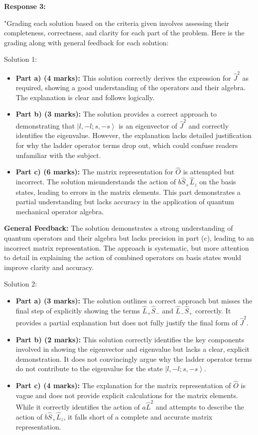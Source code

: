 \documentclass[a4paper,11pt]{article}
\begin{document}
\textbf{Response 3:}

"Grading each solution based on the criteria given involves assessing their completeness, correctness, and clarity for each part of the problem. Here is the grading along with general feedback for each solution:

Solution 1:

\begin{itemize}
    \item \textbf{Part a) (4 marks):} This solution correctly derives the expression for \( \hat{J}^2 \) as required, showing a good understanding of the operators and their algebra. The explanation is clear and follows logically.
    \item \textbf{Part b) (3 marks):} The solution provides a correct approach to demonstrating that \( \left|l, -l; s, -s \right> \) is an eigenvector of \( \hat{J}^2 \) and correctly identifies the eigenvalue. However, the explanation lacks detailed justification for why the ladder operator terms drop out, which could confuse readers unfamiliar with the subject.
    \item \textbf{Part c) (6 marks):} The matrix representation for \( \hat{O} \) is attempted but incorrect. The solution misunderstands the action of \( b\hat{S}_{+}\hat{L}_{z} \) on the basis states, leading to errors in the matrix elements. This part demonstrates a partial understanding but lacks accuracy in the application of quantum mechanical operator algebra.
\end{itemize}

\textbf{General Feedback:} The solution demonstrates a strong understanding of quantum operators and their algebra but lacks precision in part (c), leading to an incorrect matrix representation. The approach is systematic, but more attention to detail in explaining the action of combined operators on basis states would improve clarity and accuracy.

Solution 2:

\begin{itemize}
    \item \textbf{Part a) (3 marks):} The solution outlines a correct approach but misses the final step of explicitly showing the terms \( \hat{L}_{+}\hat{S}_{-} \) and \( \hat{L}_{-}\hat{S}_{+} \) correctly. It provides a partial explanation but does not fully justify the final form of \( \hat{J}^2 \).
    \item \textbf{Part b) (2 marks):} This solution correctly identifies the key components involved in showing the eigenvector and eigenvalue but lacks a clear, explicit demonstration. It does not convincingly argue why the ladder operator terms do not contribute to the eigenvalue for the state \( \left|l, -l; s, -s \right> \).
    \item \textbf{Part c) (4 marks):} The explanation for the matrix representation of \( \hat{O} \) is vague and does not provide explicit calculations for the matrix elements. While it correctly identifies the action of \( a\hat{L}^2 \) and attempts to describe the action of \( b\hat{S}_{+}\hat{L}_{z} \), it falls short of a complete and accurate matrix representation.
\end{itemize}
\end{document}

